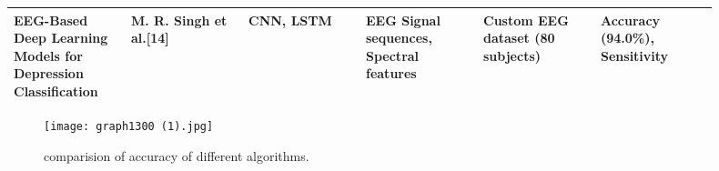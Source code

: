 \documentclass[conference]{IEEEtran}
\begin{document}
\begin{table*}
\begin{adjustbox}{max width=\linewidth,center}
\begin{tabular}{|p{0.15\linewidth}|p{0.15\linewidth}|p{0.15\linewidth}|p{0.15\linewidth}|p{0.15\linewidth}|p{0.15\linewidth}|}
\hline
EEG-Based Deep Learning Models for Depression Classification & M. R. Singh et al.[14] & CNN, LSTM & EEG Signal sequences, Spectral features & Custom EEG dataset (80 subjects) & Accuracy (94.0\%), Sensitivity \\
\hline
  \end{tabular}
  \end{adjustbox}
\end{table*}

    

\begin{figure*}[htbp]
\centering
\texttt{[image: graph1300 (1).jpg]}  %
\caption{comparision of accuracy of  different algorithms.}
\label{fig}
\end{figure*}
\end{document}
